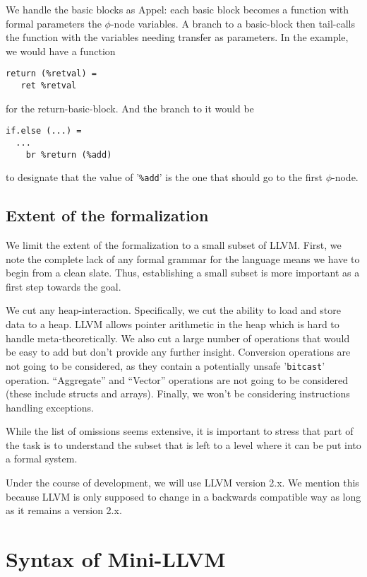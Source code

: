 \documentclass[a4paper, oneside, 10pt, draft]{memoir}
\begin{document}
We handle the basic blocks as Appel: each basic block becomes a
function with formal parameters the $\phi$-node variables. A branch to
a basic-block then tail-calls the function with the variables needing
transfer as parameters. In the example, we would have a function
\begin{verbatim}
return (%retval) =
   ret %retval
\end{verbatim}
for the return-basic-block. And the branch to it would be
\begin{verbatim}
if.else (...) =
  ...
    br %return (%add)
\end{verbatim}
to designate that the value of '\texttt{\%add}' is the one that should
go to the first $\phi$-node.

\section{Extent of the formalization}

We limit the extent of the formalization to a small subset of
LLVM. First, we note the complete lack of any formal grammar for
the language means we have to begin from a clean slate. Thus,
establishing a small subset is more important as a first step towards
the goal.

We cut any heap-interaction. Specifically, we cut the ability to
load and store data to a heap. LLVM allows pointer arithmetic in the
heap which is hard to handle meta-theoretically. We also cut a large
number of operations that would be easy to add but don't provide
any further insight. Conversion operations are not going to be
considered, as they contain a potentially unsafe '\texttt{bitcast}'
operation. ``Aggregate'' and ``Vector'' operations are not going to be
considered (these include structs and arrays). Finally, we won't be
considering instructions handling exceptions.

While the list of omissions seems extensive, it is important to stress
that part of the task is to understand the subset that is left to a
level where it can be put into a formal system.

Under the course of development, we will use LLVM version 2.x. We
mention this because LLVM is only supposed to change in a backwards
compatible way as long as it remains a version 2.x.

\chapter{Syntax of Mini-LLVM}
\end{document}
